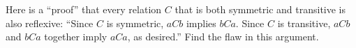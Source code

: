 \documentclass[../main.tex]{subfiles}
\begin{document}
\problem{}\label{s3p3}

Here is a ``proof'' that every relation \(C\) that is both symmetric and
transitive is also reflexive: ``Since \(C\) is symmetric, \(aCb\) implies
\(bCa\). Since \(C\) is transitive, \(aCb\) and \(bCa\) together imply \(aCa\),
as desired.'' Find the flaw in this argument.

%
\end{document}
